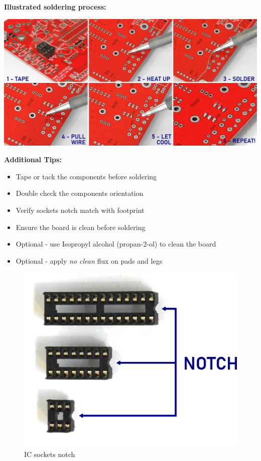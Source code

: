 \documentclass{scrartcl}
\begin{document}
\pagebreak
\textbf{Illustrated soldering process:}

\begin{center}
    \includegraphics[scale=0.65]{assets/solder-strip.jpg}
\end{center}

\vspace{0.50cm}
\textbf{Additional Tips:}

\begin{itemize}
    \item Tape or tack the components before soldering
    \item Double check the components orientation
    \item Verify sockets notch match with footprint
    \item Ensure the board is clean before soldering
    \item Optional - use Isopropyl alcohol (propan-2-ol) to clean the board
    \item Optional - apply \emph{no clean} flux on pads and legs
\end{itemize}

\vspace{0.25cm}

\begin{figure}[!ht]
    \begin{center}
        \includegraphics[scale=0.38]{assets/ic-notch.png}
        \caption{IC sockets notch}
    \end{center}
\end{figure}
\end{document}
